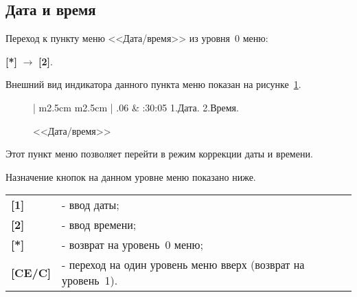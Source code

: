 \subsection{Дата и время} \label{ssec:datetime}

Переход к пункту меню <<Дата/время>> из уровня~0 меню: 

\textbf{[*]} $\rightarrow$ \textbf{[2]}.

Внешний вид индикатора данного пункта меню показан на рисунке~\ref{fig:dateTime}.
 
 \begin{figure}[H]
 	\centering
 	
	\begin{tabular}{| m{2.5cm}  m{2.5cm} |}
		.06	& :30:05	\tabularnewline 
		 {1.Дата.} 		\tabularnewline
		 {2.Время.} 	\tabularnewline 
		 {}				\tabularnewline 
		\lasthline
	\end{tabular} 
	
	\caption{<<Дата/время>>}
	\label{fig:dateTime}
\end{figure}

Этот пункт меню позволяет перейти в режим коррекции даты и времени.

Назначение кнопок на данном уровне меню показано ниже.

\begin{center}
	\begin{tabular}{p{2cm} p{15cm}}
		\textbf{[1]} & - ввод даты;					\tabularnewline 
		\textbf{[2]} & - ввод времени;				\tabularnewline 
		\textbf{[*]} & - возврат на уровень~0 меню; \tabularnewline
		\textbf{[CE/C]} & - переход на один уровень меню вверх (возврат на уровень~1).	\tabularnewline				
	\end{tabular} 
\end{center}